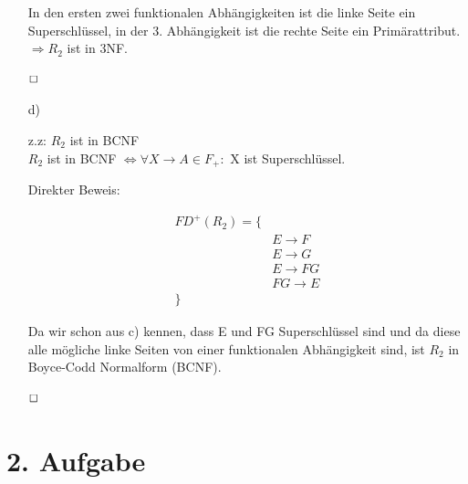 \begin{enumerate}
In den ersten zwei funktionalen Abhängigkeiten ist die linke Seite ein Superschlüssel, in der 3. Abhängigkeit ist die rechte Seite ein Primärattribut.
$\Rightarrow R_2$ ist in 3NF.

$\hfill \Box$

\item[d)]

z.z: $R_2$ ist in BCNF \\
$R_2$ ist in BCNF $\Leftrightarrow \forall X \rightarrow A \in F_{+}:$ X ist Superschlüssel.

Direkter Beweis: 

\begin{align*}
    FD^{+}(R_2) = \{ & \\
    & E \rightarrow F \\
    & E \rightarrow G \\
    & E \rightarrow FG \\
    & FG \rightarrow E \\
    \} &
\end{align*}

Da wir schon aus c) kennen, dass E und FG Superschlüssel sind und da diese alle mögliche linke Seiten von einer funktionalen Abhängigkeit sind, ist $R_2$ in Boyce-Codd Normalform (BCNF).

$\hfill \Box$

\end{enumerate}

\section*{2. Aufgabe}

